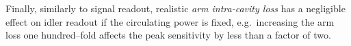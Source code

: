 Finally, similarly to signal readout, realistic \emph{arm intra-cavity loss} has a negligible effect on idler readout if the circulating power is fixed, e.g.\ increasing the arm loss one hundred--fold affects the peak sensitivity by less than a factor of two. %


